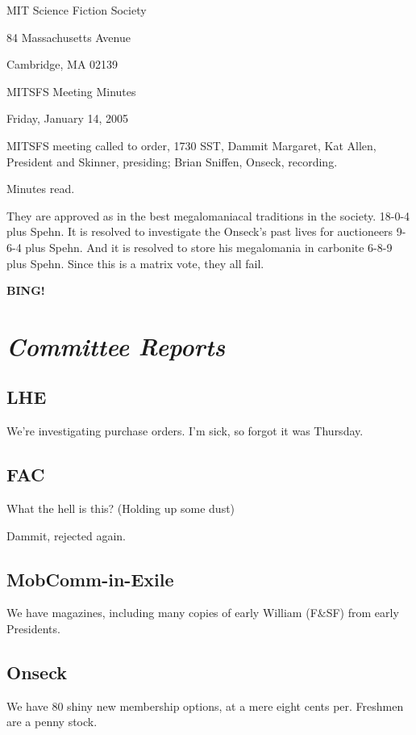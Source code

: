 \documentclass[10pt]{article}
\newcommand{\bing}{{\bf BING!} }
\newcommand{\goto}[1]{\bing \vskip 12pt \section*{{\em{#1}}}}
\newcommand{\ps}{ plus Spehn\xspace}
\begin{document}
\begin{center}

MIT Science Fiction Society

84 Massachusetts Avenue

Cambridge, MA 02139

\vspace{12pt}

MITSFS Meeting Minutes

Friday, January 14, 2005

\end{center}

\vspace{18pt}

\setlength{\parskip}{6pt}

\noindent
MITSFS meeting called to order, 1730 SST, Dammit Margaret, Kat Allen, President and
Skinner, presiding; Brian Sniffen,  Onseck, recording.

Minutes read.

They are approved as in the best megalomaniacal traditions in the society.
18-0-4\ps.
It is resolved to investigate the Onseck's past lives for auctioneers 9-6-4\ps.
And it is resolved to store his megalomania in carbonite 6-8-9\ps.
Since this is a matrix vote, they all fail.

\goto{Committee Reports}
\subsection*{LHE}
We're investigating purchase orders.  I'm sick, so forgot it was
Thursday.

\subsection*{FAC}
What the hell is this?  (Holding up some dust)

Dammit, rejected again.

\subsection*{MobComm-in-Exile}
We have magazines, including many copies of early William (F\&SF) from
early Presidents.

\subsection*{Onseck}
We have 80 shiny new membership options, at a mere eight cents per.
Freshmen are a penny stock.
\end{document}
